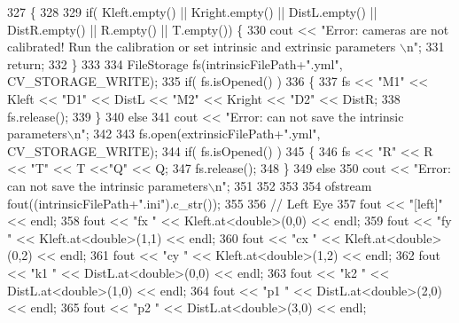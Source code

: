 \begin{DoxyCode}
327                                                                                      \{
328 
329     \textcolor{keywordflow}{if}( Kleft.empty() || Kright.empty() || DistL.empty() || DistR.empty() || R.empty() || T.empty()) \{
330             cout << \textcolor{stringliteral}{"Error: cameras are not calibrated! Run the calibration or set intrinsic and extrinsic
       parameters \(\backslash\)n"};
331             \textcolor{keywordflow}{return};
332     \}
333 
334     FileStorage fs(intrinsicFilePath+\textcolor{stringliteral}{".yml"}, CV\_STORAGE\_WRITE);
335     \textcolor{keywordflow}{if}( fs.isOpened() )
336     \{
337         fs << \textcolor{stringliteral}{"M1"} << Kleft << \textcolor{stringliteral}{"D1"} << DistL << \textcolor{stringliteral}{"M2"} << Kright << \textcolor{stringliteral}{"D2"} << DistR;
338         fs.release();
339     \}
340     \textcolor{keywordflow}{else}
341         cout << \textcolor{stringliteral}{"Error: can not save the intrinsic parameters\(\backslash\)n"};
342 
343     fs.open(extrinsicFilePath+\textcolor{stringliteral}{".yml"}, CV\_STORAGE\_WRITE);
344     \textcolor{keywordflow}{if}( fs.isOpened() )
345     \{
346         fs << \textcolor{stringliteral}{"R"} << R << \textcolor{stringliteral}{"T"} << T <<\textcolor{stringliteral}{"Q"} << Q;
347         fs.release();
348     \}
349     \textcolor{keywordflow}{else}
350         cout << \textcolor{stringliteral}{"Error: can not save the intrinsic parameters\(\backslash\)n"};
351 
352 
353 
354     ofstream fout((intrinsicFilePath+\textcolor{stringliteral}{".ini"}).c\_str());
355 
356     \textcolor{comment}{// Left Eye}
357     fout << \textcolor{stringliteral}{"[left]"} << endl;
358     fout << \textcolor{stringliteral}{"fx "} << Kleft.at<\textcolor{keywordtype}{double}>(0,0) << endl;
359     fout << \textcolor{stringliteral}{"fy "} << Kleft.at<\textcolor{keywordtype}{double}>(1,1) << endl;
360     fout << \textcolor{stringliteral}{"cx "} << Kleft.at<\textcolor{keywordtype}{double}>(0,2) << endl;
361     fout << \textcolor{stringliteral}{"cy "} << Kleft.at<\textcolor{keywordtype}{double}>(1,2) << endl;
362     fout << \textcolor{stringliteral}{"k1 "} << DistL.at<\textcolor{keywordtype}{double}>(0,0) << endl;
363     fout << \textcolor{stringliteral}{"k2 "} << DistL.at<\textcolor{keywordtype}{double}>(1,0) << endl;
364     fout << \textcolor{stringliteral}{"p1 "} << DistL.at<\textcolor{keywordtype}{double}>(2,0) << endl;
365     fout << \textcolor{stringliteral}{"p2 "} << DistL.at<\textcolor{keywordtype}{double}>(3,0) << endl;

\end{DoxyCode}
